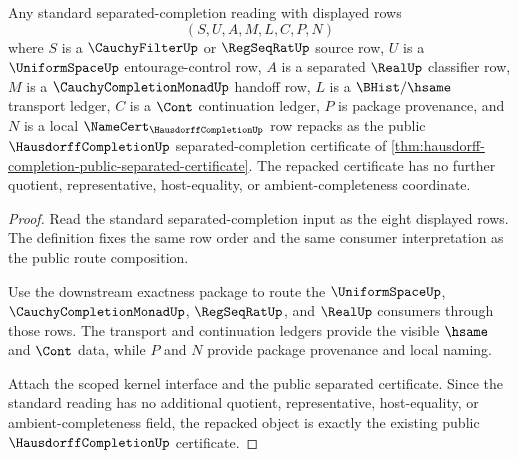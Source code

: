 \begin{theorem}
\label{thm:hausdorff-completion-standard-to-bedc-separated-bridge}
Any standard separated-completion reading with displayed rows
$$
(S,U,A,M,L,C,P,N)
$$
where $S$ is a $\CauchyFilterUp$ or $\RegSeqRatUp$ source row, $U$ is a $\UniformSpaceUp$ entourage-control row, $A$ is a separated $\RealUp$ classifier row, $M$ is a $\CauchyCompletionMonadUp$ handoff row, $L$ is a $\BHist/\hsame$ transport ledger, $C$ is a $\Cont$ continuation ledger, $P$ is package provenance, and $N$ is a local $\NameCert_{\HausdorffCompletionUp}$ row repacks as the public $\HausdorffCompletionUp$ separated-completion certificate of \autoref{thm:hausdorff-completion-public-separated-certificate}. The repacked certificate has no further quotient, representative, host-equality, or ambient-completeness coordinate.
\end{theorem}
\begin{proof}
Read the standard separated-completion input as the eight displayed rows. The definition fixes the same row order and the same consumer interpretation as the public route composition.

Use the downstream exactness package to route the $\UniformSpaceUp$, $\CauchyCompletionMonadUp$, $\RegSeqRatUp$, and $\RealUp$ consumers through those rows. The transport and continuation ledgers provide the visible $\hsame$ and $\Cont$ data, while $P$ and $N$ provide package provenance and local naming.

Attach the scoped kernel interface and the public separated certificate. Since the standard reading has no additional quotient, representative, host-equality, or ambient-completeness field, the repacked object is exactly the existing public $\HausdorffCompletionUp$ certificate.
\end{proof}

